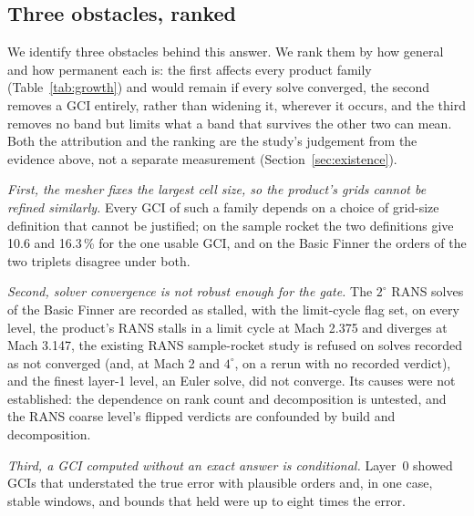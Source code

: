 \documentclass[twocolumn]{labreport}
\begin{document}
\subsection{Three obstacles, ranked}
\label{sec:causes}

We identify three obstacles behind this answer.
We rank them by how general and how permanent each is: the first affects every product family (Table~\ref{tab:growth}) and would remain if every solve converged, the second removes a GCI entirely, rather than widening it, wherever it occurs, and the third removes no band but limits what a band that survives the other two can mean.
Both the attribution and the ranking are the study's judgement from the evidence above, not a separate measurement (Section~\ref{sec:existence}).

\emph{First, the mesher fixes the largest cell size, so the product's grids cannot be refined similarly.}
Every GCI of such a family depends on a choice of grid-size definition that cannot be justified; on the sample rocket the two definitions give 10.6 and 16.3\,\% for the one usable GCI, and on the Basic Finner the orders of the two triplets disagree under both.

\emph{Second, solver convergence is not robust enough for the gate.}
The $2^\circ$ RANS solves of the Basic Finner are recorded as stalled, with the limit-cycle flag set, on every level, the product's RANS stalls in a limit cycle at Mach 2.375 and diverges at Mach 3.147, the existing RANS sample-rocket study is refused on solves recorded as not converged (and, at Mach 2 and $4^\circ$, on a rerun with no recorded verdict), and the finest layer-1 level, an Euler solve, did not converge.
Its causes were not established: the dependence on rank count and decomposition is untested, and the RANS coarse level's flipped verdicts are confounded by build and decomposition.

\emph{Third, a GCI computed without an exact answer is conditional.}
Layer~0 showed GCIs that understated the true error with plausible orders and, in one case, stable windows, and bounds that held were up to eight times the error.
\end{document}
